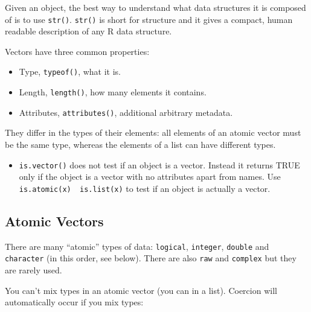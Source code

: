 \documentclass[]{book}
\providecommand{\tightlist}{%
  \setlength{\itemsep}{0pt}\setlength{\parskip}{0pt}}
\newenvironment{rmdblock}[1]
  {\begin{shaded*}
  \begin{itemize}
  \renewcommand{\labelitemi}{
    \raisebox{-.7\height}[0pt][0pt]{
      {\setkeys{Gin}{width=3em,keepaspectratio}\texttt{[image: images/\#1]}}
    }
  }
  \item
  }
  {
  \end{itemize}
  \end{shaded*}
  }
\newenvironment{rmdnote}
  {\begin{rmdblock}{note}}
  {\end{rmdblock}}
\theoremstyle{definition}
\theoremstyle{definition}
\theoremstyle{definition}
\theoremstyle{remark}
\begin{document}
Given an object, the best way to understand what data structures it is
composed of is to use \texttt{str()}. \texttt{str()} is short for
structure and it gives a compact, human readable description of any R
data structure.

Vectors have three common properties:

\begin{itemize}
\tightlist
\item
  Type, \texttt{typeof()}, what it is.
\item
  Length, \texttt{length()}, how many elements it contains.
\item
  Attributes, \texttt{attributes()}, additional arbitrary metadata.
\end{itemize}

They differ in the types of their elements: all elements of an atomic
vector must be the same type, whereas the elements of a list can have
different types.

\begin{rmdnote}
\texttt{is.vector()} does not test if an object is a vector. Instead it
returns TRUE only if the object is a vector with no attributes apart
from names. Use \texttt{is.atomic(x)\ \textbar{}\textbar{}\ is.list(x)}
to test if an object is actually a vector.
\end{rmdnote}

\subsection{Atomic Vectors}\label{atomic-vectors}

There are many ``atomic'' types of data: \texttt{logical},
\texttt{integer}, \texttt{double} and \texttt{character} (in this order,
see below). There are also \texttt{raw} and \texttt{complex} but they
are rarely used.

You can't mix types in an atomic vector (you can in a list). Coercion
will automatically occur if you mix types:
\end{document}
